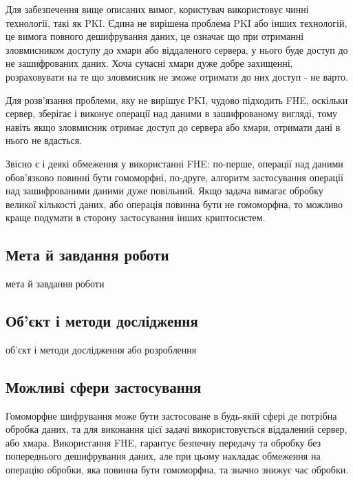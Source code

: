 Для забезпечення вище описаних вимог, користувач використовує чинні технології, такі
як PKI. Єдина не вирішена проблема PKI або інших технологій, це вимога повного
дешифрування даних, це означає що при отриманні зловмисником доступу до хмари або
віддаленого сервера, у нього буде доступ до не зашифрованих даних. Хоча сучасні хмари
дуже добре захищенні, розраховувати на те що зловмисник не зможе отримати до них
доступ - не варто. 

Для розв'язання проблеми, яку не вирішує PKI, чудово підходить FHE, оскільки сервер,
зберігає і виконує операції над даними в зашифрованому вигляді, тому навіть якщо
зловмисник отримає доступ до сервера або хмари, отримати дані в нього не вдасться.

Звісно є і деякі обмеження у використанні FHE: по-перше, операції над даними
обов'язково повинні бути гомоморфні, по-друге, алгоритм застосування операції над
зашифрованими даними дуже повільний. Якщо задача вимагає обробку великої кількості
даних, або операція повинна бути не гомоморфна, то можливо краще подумати в сторону
застосування інших криптосистем.

\subsection*{Мета й завдання роботи}
мета й завдання роботи
\subsection*{Об’єкт і методи дослідження}
об’єкт і методи дослідження або розроблення
\subsection*{Можливі сфери застосування}
Гомоморфне шифрування може бути застосоване в будь-якій сфері де потрібна обробка
даних, та для виконання цієї задачі використовується віддалений сервер, або хмара.
Використання FHE, гарантує безпечну передачу та обробку без попереднього дешифрування
даних, але при цьому накладає обмеження на операцію обробки, яка повинна бути
гомоморфна, та значно знижує час обробки.
